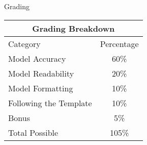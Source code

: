 \documentclass[]{article}
\begin{document}
\begin{section}{Grading}
\begin{center}
\begin{tabular}{lc}
\multicolumn{2}{c}{Grading Breakdown}\\

\toprule
Category & Percentage\\

\cmidrule(lr){1-2}
Model Accuracy & 60\%\\
Model Readability & 20\%\\
Model Formatting & 10\%\\
Following the Template & 10\%\\
Bonus & 5\%\\

\midrule
Total Possible & 105\%\\

\bottomrule
\end{tabular}
\end{center}
\end{section}
\end{document}
